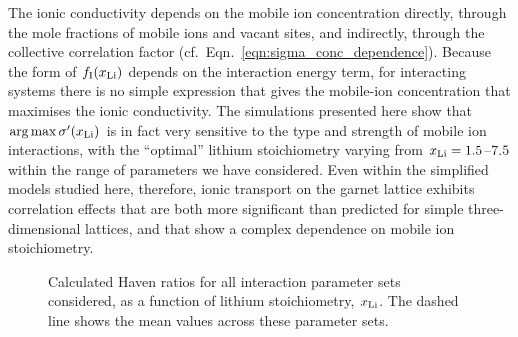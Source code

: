 \documentclass[aps,prb,twocolumn,superscriptaddress,reprint]{revtex4-1}
\newcommand{\xLi}{x_\m{Li}}
\begin{document}
The ionic conductivity depends on the mobile ion concentration directly, through the mole fractions of mobile ions and vacant sites, and indirectly, through the collective correlation factor (cf.\ Eqn.~\ref{eqn:sigma_conc_dependence}). Because the form of $f_\m{I}(\xLi)$ depends on the interaction energy term, for interacting systems there is no simple expression that gives the mobile-ion concentration that maximises the ionic conductivity. The simulations presented here show that $\arg \max \sigma^\prime(\xLi)$ is in fact very sensitive to the type and strength of mobile ion interactions, with the ``optimal'' lithium stoichiometry varying from $\xLi=1.5$--$7.5$ within the range of parameters we have considered. Even within the simplified models studied here, therefore, ionic transport on the garnet lattice exhibits correlation effects that are both more significant than predicted for simple three-dimensional lattices, and that show a complex dependence on mobile ion stoichiometry.

\begin{figure}[tb]
  \centering
    \caption{\label{fig:haven_ratios}Calculated Haven ratios for all interaction parameter sets considered, as a function of lithium stoichiometry, $\xLi$. The dashed line shows the mean values across these parameter sets.}
\end{figure}
\end{document}
